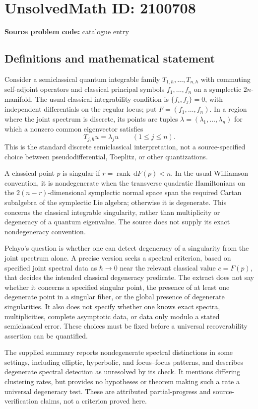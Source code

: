 \documentclass[11pt]{article}
\newcommand{\dd}{\,\mathrm{d}}
\begin{document}
\section*{UnsolvedMath ID: 2100708}
\textbf{Source problem code:} catalogue entry
\subsection{Definitions and mathematical statement}
Consider a semiclassical quantum integrable family $T_{1,\hbar},\ldots,T_{n,\hbar}$ with commuting self-adjoint operators and classical principal symbols $f_1,\ldots,f_n$ on a symplectic $2n$-manifold. The usual classical integrability condition is $\{f_i,f_j\}=0$, with independent differentials on the regular locus; put $F=(f_1,\ldots,f_n)$. In a region where the joint spectrum is discrete, its points are tuples $\lambda=(\lambda_1,\ldots,\lambda_n)$ for which a nonzero common eigenvector satisfies
\[
T_{j,\hbar}u=\lambda_j u\qquad(1\le j\le n).
\]
This is the standard discrete semiclassical interpretation, not a source-specified choice between pseudodifferential, Toeplitz, or other quantizations.

A classical point $p$ is singular if $r=\operatorname{rank}\dd F(p)<n$. In the usual Williamson convention, it is nondegenerate when the transverse quadratic Hamiltonians on the $2(n-r)$-dimensional symplectic normal space span the required Cartan subalgebra of the symplectic Lie algebra; otherwise it is degenerate. This concerns the classical integrable singularity, rather than multiplicity or degeneracy of a quantum eigenvalue. The source does not supply its exact nondegeneracy convention.

Pelayo's question is whether one can detect degeneracy of a singularity from the joint spectrum alone. A precise version seeks a spectral criterion, based on specified joint spectral data as $\hbar\to0$ near the relevant classical value $c=F(p)$, that decides the intended classical degeneracy predicate. The extract does not say whether it concerns a specified singular point, the presence of at least one degenerate point in a singular fiber, or the global presence of degenerate singularities. It also does not specify whether one knows exact spectra, multiplicities, complete asymptotic data, or data only modulo a stated semiclassical error. These choices must be fixed before a universal recoverability assertion can be quantified.

The supplied summary reports nondegenerate spectral distinctions in some settings, including elliptic, hyperbolic, and focus--focus patterns, and describes degenerate spectral detection as unresolved by its check. It mentions differing clustering rates, but provides no hypotheses or theorem making such a rate a universal degeneracy test. These are attributed partial-progress and source-verification claims, not a criterion proved here.
\end{document}

